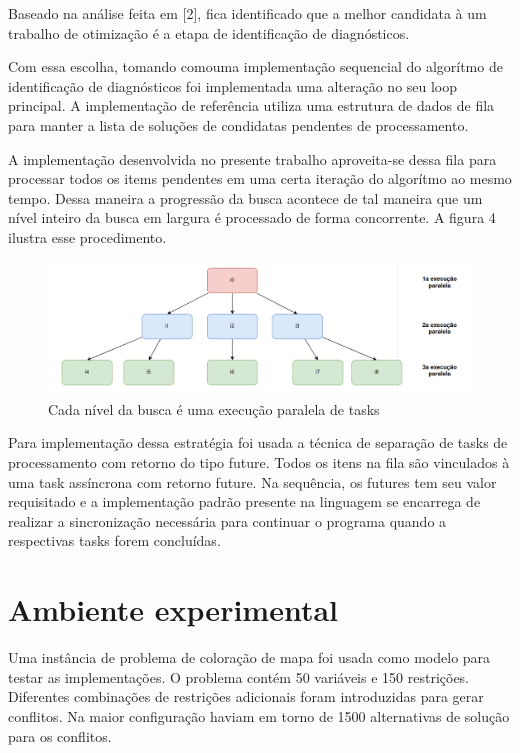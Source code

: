 \documentclass[conference]{IEEEtran}
\begin{document}
Baseado na análise feita em [2], fica identificado que a melhor candidata à um trabalho de otimização é a etapa de identificação de diagnósticos.

Com essa escolha, tomando comouma implementação sequencial do algorítmo de identificação de diagnósticos foi implementada uma alteração no seu loop principal. A implementação de referência utiliza uma estrutura de dados de fila para manter a lista de soluções de condidatas pendentes de processamento. 

A implementação desenvolvida no presente trabalho aproveita-se  dessa fila para processar todos os items pendentes em uma certa iteração do algorítmo ao mesmo tempo. Dessa maneira a progressão da busca acontece de tal maneira que um nível inteiro da busca em largura é processado de forma concorrente. A figura 4 ilustra esse procedimento.

\begin{figure}[htbp]
\centerline{\includegraphics[width=1\columnwidth]{runtime.png}}
\caption{Cada nível da busca é uma execução paralela de tasks} 
\label{fig}
\end{figure}

Para implementação dessa estratégia foi usada a técnica de separação de tasks de processamento com retorno do tipo future. Todos os itens na fila são vinculados à uma task assíncrona com retorno future. Na sequência, os futures tem seu valor requisitado e a implementação padrão presente na linguagem se encarrega de realizar a sincronização necessária para continuar o programa quando a respectivas tasks forem concluídas. 

\section{Ambiente experimental}

Uma instância de problema de coloração de mapa foi usada como modelo para testar as implementações. O problema contém 50 variáveis e 150 restrições. Diferentes combinações de restrições adicionais foram introduzidas para gerar conflitos. Na maior configuração haviam em torno de 1500 alternativas de solução para os conflitos. 
\end{document}
